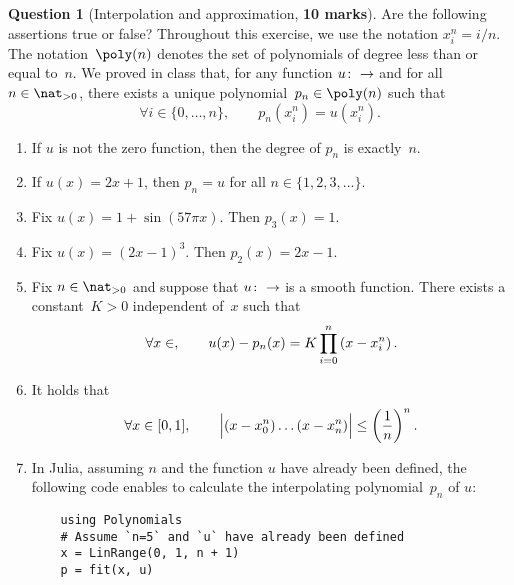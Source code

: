 \documentclass[10pt]{article}
\theoremstyle{definition}
\newtheorem{question}{Question}
\theoremstyle{remark}
\begin{document}
\newpage
\begin{question}
    [Interpolation and approximation, \textbf{10 marks}]
    Are the following assertions true or false?
    Throughout this exercise, we use the notation
    $x^n_i = i/n$.
    The notation~$\poly(n)$ denotes the set of polynomials of degree less than or equal to~$n$.
    We proved in class that,
    for any function $u \colon \real \to \real$ and for all $n \in \nat_{>0}$,
    there exists a unique polynomial~$p_n \in \poly(n)$ such that
    \begin{equation}
        \label{eq:interpolation}
        \forall i \in \{0, \dotsc, n\}, \qquad
        p_n(x^n_i) = u (x^n_i).
    \end{equation}

    \begin{enumerate}
        \item
            If $u$ is not the zero function,
            then the degree of $p_n$ is exactly~$n$.

        \item
            If $u(x) = 2x + 1$,
            then $p_n = u$ for all $n \in \{1, 2, 3, \dotsc\}$.

        \item
            Fix $u(x) = 1 + \sin(57\pi x)$. Then $p_3(x) = 1$.

        \item
            Fix $u(x) = (2x - 1)^3$.
            Then $p_2(x) = 2x - 1$.

        \item
            Fix $n \in \nat_{>0}$ and suppose that $u\colon \real \to \real$ is a smooth function.
            There exists a constant~$K > 0$ independent of~$x$ such that
            \[
                \forall x \in \real,
                \qquad u(x) - p_n(x) = K \prod_{i=0}^{n} \left(x - x^n_i\right).
            \]

        \item
            It holds that
            \[
                \forall x \in [0, 1], \qquad
                \Bigl\lvert (x - x^n_0) \dotsc (x - x^n_n) \Bigr\rvert \leq \left(\frac{1}{n}\right)^n.
            \]

        \item
            In Julia, assuming $n$ and the function $u$ have already been defined,
            the following code enables to calculate the interpolating polynomial~$p_n$ of $u$:
            \begin{verbatim}
    using Polynomials
    # Assume `n=5` and `u` have already been defined
    x = LinRange(0, 1, n + 1)
    p = fit(x, u)
            \end{verbatim}


\end{enumerate}
\end{question}
\end{document}
